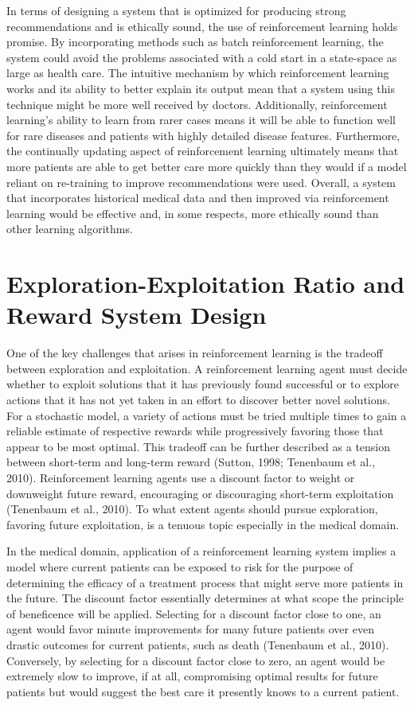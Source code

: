 \documentclass[]{spie}  %
\begin{document}
In terms of designing a system that is optimized for producing strong recommendations and is ethically sound, the use of reinforcement learning holds promise. By incorporating methods such as batch reinforcement learning, the system could avoid the problems associated with a cold start in a state-space as large as health care. The intuitive mechanism by which reinforcement learning works and its ability to better explain its output mean that a system using this technique might be more well received by doctors. Additionally, reinforcement learning’s ability to learn from rarer cases means it will be able to function well for rare diseases and patients with highly detailed disease features. Furthermore, the continually updating aspect of reinforcement learning ultimately means that more patients are able to get better care more quickly than they would if a model reliant on re-training to improve recommendations were used. Overall, a system that incorporates historical medical data and then improved via reinforcement learning would be effective and, in some respects, more ethically sound than other learning algorithms.

\section{Exploration-Exploitation Ratio and Reward System Design}

One of the key challenges that arises in reinforcement learning is the tradeoff between exploration and exploitation. A reinforcement learning agent must decide whether to exploit solutions that it has previously found successful or to explore actions that it has not yet taken in an effort to discover better novel solutions. For a stochastic model, a variety of actions must be tried multiple times to gain a reliable estimate of respective rewards while progressively favoring those that appear to be most optimal. This tradeoff can be further described as a tension between short-term and long-term reward (Sutton, 1998; Tenenbaum et al., 2010). Reinforcement learning agents use a discount factor to weight or downweight future reward, encouraging or discouraging short-term exploitation (Tenenbaum et al., 2010). To what extent agents should pursue exploration, favoring future exploitation, is a tenuous topic especially in the medical domain.

In the medical domain, application of a reinforcement learning system implies a model where current patients can be exposed to risk for the purpose of determining the efficacy of a treatment process that might serve more patients in the future. The discount factor essentially determines at what scope the principle of beneficence will be applied. Selecting for a discount factor close to one, an agent would favor minute improvements for many future patients over even drastic outcomes for current patients, such as death (Tenenbaum et al., 2010). Conversely, by selecting for a discount factor close to zero, an agent would be extremely slow to improve, if at all, compromising optimal results for future patients but would suggest the best care it presently knows to a current patient.
\end{document}
